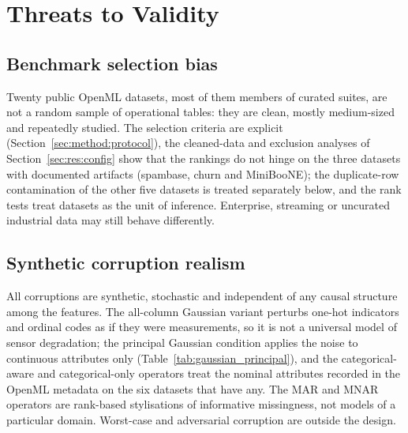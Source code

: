 \documentclass[pdflatex,sn-mathphys]{sn-jnl}
\theoremstyle{thmstyleone}
\theoremstyle{thmstyletwo}
\theoremstyle{thmstylethree}
\begin{document}
\section{Threats to Validity}\label{sec:threats}

\subsection{Benchmark selection bias}\label{sec:threats:selection}
Twenty public OpenML datasets, most of them members of curated suites, are not a random sample of operational tables: they are clean, mostly medium-sized and repeatedly studied. The selection criteria are explicit (Section~\ref{sec:method:protocol}), the cleaned-data and exclusion analyses of Section~\ref{sec:res:config} show that the rankings do not hinge on the three datasets with documented artifacts (spambase, churn and MiniBooNE); the duplicate-row contamination of the other five datasets is treated separately below, and the rank tests treat datasets as the unit of inference. Enterprise, streaming or uncurated industrial data may still behave differently.

\subsection{Synthetic corruption realism}\label{sec:threats:realism}
All corruptions are synthetic, stochastic and independent of any causal structure among the features. The all-column Gaussian variant perturbs one-hot indicators and ordinal codes as if they were measurements, so it is not a universal model of sensor degradation; the principal Gaussian condition applies the noise to continuous attributes only (Table~\ref{tab:gaussian_principal}), and the categorical-aware and categorical-only operators treat the nominal attributes recorded in the OpenML metadata on the six datasets that have any. The MAR and MNAR operators are rank-based stylisations of informative missingness, not models of a particular domain. Worst-case and adversarial corruption are outside the design.
\end{document}
